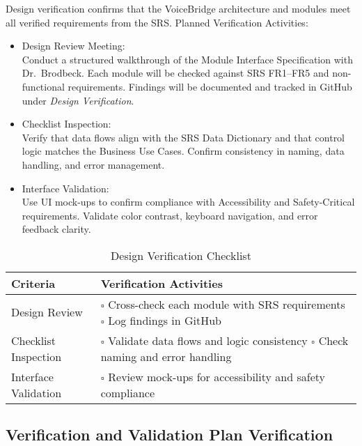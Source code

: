 \documentclass[12pt, titlepage]{article}
\begin{document}
Design verification confirms that the VoiceBridge architecture and modules meet all verified requirements from the SRS. Planned Verification Activities:

\begin{itemize}
    \item Design Review Meeting: \\
    Conduct a structured walkthrough of the Module Interface Specification with Dr.~Brodbeck. Each module will be checked against SRS FR1--FR5 and non-functional requirements. Findings will be documented and tracked in GitHub under \textit{Design Verification}.
    
    \item Checklist Inspection: \\
    Verify that data flows align with the SRS Data Dictionary and that control logic matches the Business Use Cases. Confirm consistency in naming, data handling, and error management.
    
    \item Interface Validation: \\
    Use UI mock-ups to confirm compliance with Accessibility and Safety-Critical requirements. Validate color contrast, keyboard navigation, and error feedback clarity.
\end{itemize}

\begin{table}[H]
\centering
\caption{Design Verification Checklist}
\renewcommand{\arraystretch}{1.3}
\begin{tabular}{|p{5cm}|p{9cm}|}
\hline
Criteria & Verification Activities \\ \hline
Design Review &
\(\square\) Cross-check each module with SRS requirements \newline
\(\square\) Log findings in GitHub \\ \hline
Checklist Inspection &
\(\square\) Validate data flows and logic consistency \newline
\(\square\) Check naming and error handling \\ \hline
Interface Validation &
\(\square\) Review mock-ups for accessibility and safety compliance \\ \hline
\end{tabular}
\end{table}

\subsection{Verification and Validation Plan Verification}
\end{document}
